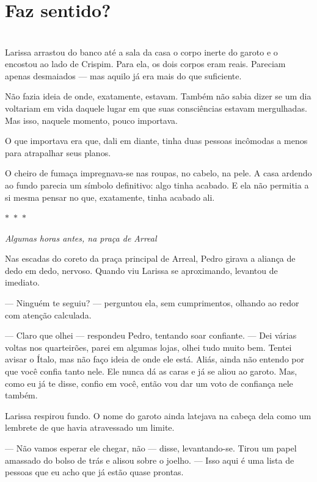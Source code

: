 \newpage
\ifdefined\useChapters
\chapter{Faz sentido?}
\else
\chapter{}
\fi

Larissa arrastou do banco até a sala da casa o corpo inerte do garoto e o encostou ao lado de Crispim. Para ela, os dois corpos eram reais.
Pareciam apenas desmaiados — mas aquilo já era mais do que suficiente.

Não fazia ideia de onde, exatamente, estavam.  
Também não sabia dizer se um dia voltariam em vida daquele lugar em que suas consciências estavam mergulhadas.  
Mas isso, naquele momento, pouco importava.

O que importava era que, dali em diante, tinha duas pessoas incômodas a menos para atrapalhar seus planos.

O cheiro de fumaça impregnava-se nas roupas, no cabelo, na pele.
A casa ardendo ao fundo parecia um símbolo definitivo: algo tinha acabado.  
E ela não permitia a si mesma pensar no que, exatamente, tinha acabado ali.

\begin{center}
$\ast$~$\ast$~$\ast$

\textit{Algumas horas antes, na praça de Arreal}
\end{center}

Nas escadas do coreto da praça principal de Arreal, Pedro girava a aliança de dedo em dedo, nervoso.
Quando viu Larissa se aproximando, levantou de imediato.

— Ninguém te seguiu? — perguntou ela, sem cumprimentos, olhando ao redor com atenção calculada.

— Claro que olhei — respondeu Pedro, tentando soar confiante. — Dei várias voltas nos quarteirões, parei em algumas lojas, olhei tudo muito bem. Tentei avisar o Ítalo, mas não faço ideia de onde ele está. Aliás, ainda não entendo por que você confia tanto nele. Ele nunca dá as caras e já se aliou ao garoto. Mas, como eu já te disse, confio em você, então vou dar um voto de confiança nele também.

Larissa respirou fundo.  
O nome do garoto ainda latejava na cabeça dela como um lembrete de que havia atravessado um limite.

— Não vamos esperar ele chegar, não — disse, levantando-se. Tirou um papel amassado do bolso de trás e alisou sobre o joelho. — Isso aqui é uma lista de pessoas que eu acho que já estão quase prontas.

